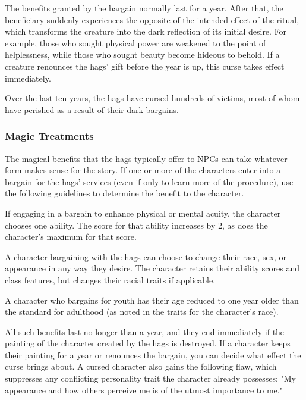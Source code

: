 \documentclass[10pt,a4paper,twoside,bg=print,twocolumn,openany,nodeprecatedcode]{dndbook}
\begin{document}
The benefits granted by the bargain normally last for a year. After that, the beneficiary suddenly experiences the opposite of the intended effect of the ritual, which transforms the creature into the dark reflection of its initial desire. For example, those who sought physical power are weakened to the point of helplessness, while those who sought beauty become hideous to behold. If a creature renounces the hags' gift before the year is up, this curse takes effect immediately.

Over the last ten years, the hags have cursed hundreds of victims, most of whom have perished as a result of their dark bargains.

\subsubsection{Magic Treatments}
The magical benefits that the hags typically offer to NPCs can take whatever form makes sense for the story. If one or more of the characters enter into a bargain for the hags' services (even if only to learn more of the procedure), use the following guidelines to determine the benefit to the character.


\begin{description}[nolistsep]
\item[Ability Enhancement]
If engaging in a bargain to enhance physical or mental acuity, the character chooses one ability. The score for that ability increases by 2, as does the character's maximum for that score.
\item[Physical Transformation]
A character bargaining with the hags can choose to change their race, sex, or appearance in any way they desire. The character retains their ability scores and class features, but changes their racial traits if applicable.
\item[Youth]
A character who bargains for youth has their age reduced to one year older than the standard for adulthood (as noted in the traits for the character's race).
\end{description}

All such benefits last no longer than a year, and they end immediately if the painting of the character created by the hags is destroyed. If a character keeps their painting for a year or renounces the bargain, you can decide what effect the curse brings about. A cursed character also gains the following flaw, which suppresses any conflicting personality trait the character already possesses: "My appearance and how others perceive me is of the utmost importance to me."
\end{document}
